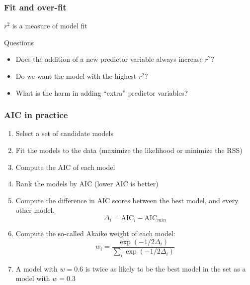 \documentclass[color=usenames,dvipsnames]{beamer}\usepackage[]{graphicx}\usepackage[]{color}
\begin{document}
\begin{frame}
  \frametitle{Fit and over-fit}
  \large
  {$r^2$ is a measure of model fit \par}
  \vspace{1cm}
  \pause
  {Questions}
  \begin{itemize}[<+->]
    \item Does the addition of a new predictor variable always
      increase $r^2$?
    \item Do we want the model with the highest $r^2$?
    \item What is the harm in adding ``extra'' predictor variables?
  \end{itemize}
\end{frame}


\begin{frame}
  \frametitle{AIC in practice}
  \large
\begin{enumerate}[<+- | visible@+->][\bf \color{PineGreen} (1)]
  \item Select a set of candidate models
  \item Fit the models to the data (maximize the likelihood or
    minimize the RSS)
  \item Compute the AIC of each model
  \item Rank the models by AIC (lower AIC is better)
  \item Compute the difference in AIC scores between the
    best model, and every other model.
    \[
    \Delta_i = \text{AIC}_i - \text{AIC}_{min}
    \]
  \item Compute the so-called Akaike weight of each model:
    \[
    w_i = \frac{\exp(-1/2\Delta_i)}{\sum_i \exp(-1/2\Delta_i)}
    \]
  \item A model with $w=0.6$ is twice as likely to be the best model
    in the set as a model with $w=0.3$
\end{enumerate}
\end{frame}
\end{document}
